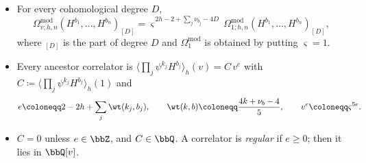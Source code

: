 \begin{lem}
\label{lem:set-modhom}
\begin{itemize}
\item[(a)] For every cohomological degree $D$,
\[
\Omega^{\mathrm{mod}}_{v;h,n}(H^{b_1},\dots,H^{b_n})_{[D]}=\varsigma^{\,2h-2+\sum_j\nu_{b_j}-4D}\,\Omega^{\mathrm{mod}}_{1;h,n}(H^{b_1},\dots,H^{b_n})_{[D]},
\]
where ${}_{[D]}$ is the part of degree $D$ and $\Omega^{\mathrm{mod}}_1$ is obtained by putting $\varsigma=1$.
\item[(b)] Every ancestor correlator is $\langle\prod_j\psi^{k_j}H^{b_j}\rangle_h(v)=C\,v^e$ with $C\coloneqq\langle\prod_j\psi^{k_j}H^{b_j}\rangle_h(1)$ and
\[
e\coloneqq2-2h+\sum_j\wt(k_j,b_j),\qquad\wt(k,b)\coloneqq\frac{4k+\nu_b-4}5,\qquad v^e\coloneqq\varsigma^{5e}.
\]
\item[(c)] $C=0$ unless $e\in\bbZ$, and $C\in\bbQ$. A correlator is \emph{regular} if $e\geq0$; then it lies in $\bbQ[v]$.
\end{itemize}
\end{lem}

